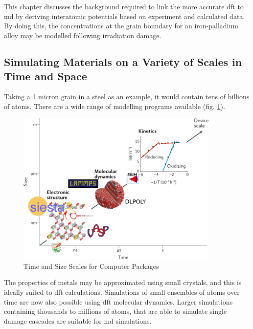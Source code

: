 This chapter discusses the background required to link the more accurate \acrshort{dft} to \acrshort{md} by deriving  interatomic potentials based on experiment and calculated data.  By doing this, the concentrations at the grain boundary for an iron-palladium alloy may be modelled following irradiation damage.



\FloatBarrier
\subsection{Simulating Materials on a Variety of Scales in Time and Space}

Taking a 1 micron grain in a steel as an example, it would contain tens of billions of atoms.  There are a wide range of modelling programs available (fig. \ref{fig:timesizascalesmodelling}). 

\begin{figure}[htbp]
  \begin{center}
    \includegraphics[width=10.0cm]{chapters/background_potential_fitting/images/scale.png}
    \caption{Time and Size Scales for Computer Packages \cite{scalediagram}}
    \label{fig:timesizascalesmodelling}
  \end{center}
\end{figure}

The properties of metals may be approximated using small crystals, and this is ideally suited to \acrshort{dft} calculations.  Simulations of small ensembles of atoms over time are now also possible using \acrshort{dft} molecular dynamics.  Larger simulations containing thousands to millions of atoms, that are able to simulate single damage cascades are suitable for \acrshort{md} simulations.  





